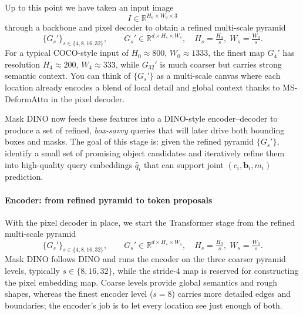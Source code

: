 \begin{enrichment}
\begin{enrichment}
		Up to this point we have taken an input image
		\[
		I \in \mathbb{R}^{H_0 \times W_0 \times 3}
		\]
		through a backbone and pixel decoder to obtain a refined multi-scale pyramid
		\[
		\{G_s'\}_{s \in \{4,8,16,32\}}, \qquad
		G_s' \in \mathbb{R}^{d \times H_s \times W_s}, \quad
		H_s = \tfrac{H_0}{s},\; W_s = \tfrac{W_0}{s}.
		\]
		For a typical COCO-style input of $H_0 \approx 800$, $W_0 \approx 1333$, the finest map $G_4'$ has resolution $H_4 \approx 200$, $W_4 \approx 333$, while $G_{32}'$ is much coarser but carries strong semantic context. You can think of $\{G_s'\}$ as a multi-scale canvas where each location already encodes a blend of local detail and global context thanks to MS-DeformAttn in the pixel decoder.
		
		Mask DINO now feeds these features into a DINO-style encoder--decoder to produce a set of refined, \emph{box-savvy} queries that will later drive both bounding boxes and masks. The goal of this stage is: given the refined pyramid $\{G_s'\}$, identify a small set of promising object candidates and iteratively refine them into high-quality query embeddings $\hat q_i$ that can support joint $(c_i,\mathbf{b}_i,m_i)$ prediction.
		
		\paragraph{Encoder: from refined pyramid to token proposals}
		
		With the pixel decoder in place, we start the Transformer stage from the refined multi-scale pyramid
		\[
		\{G_s'\}_{s \in \{4,8,16,32\}}, \qquad
		G_s' \in \mathbb{R}^{d \times H_s \times W_s}, \quad
		H_s = \tfrac{H_0}{s},\; W_s = \tfrac{W_0}{s}.
		\]
		Mask DINO follows DINO and runs the encoder on the three coarser pyramid levels, typically $s \in \{8,16,32\}$, while the stride-4 map is reserved for constructing the pixel embedding map. Coarse levels provide global semantics and rough shapes, whereas the finest encoder level ($s = 8$) carries more detailed edges and boundaries; the encoder’s job is to let every location see just enough of both.
		

\end{enrichment}
\end{enrichment}

